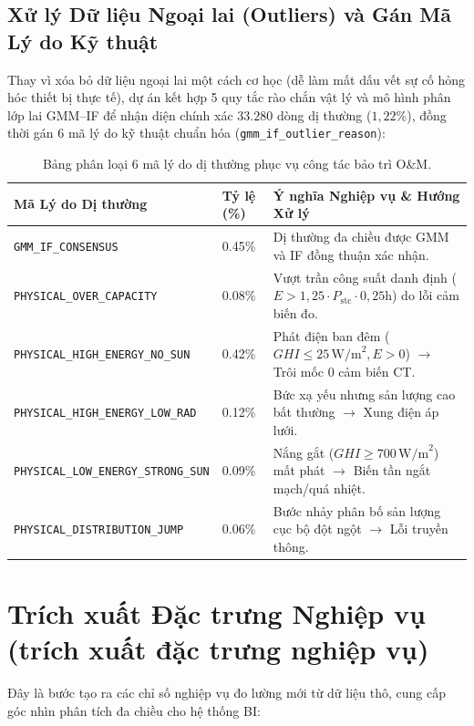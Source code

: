 \documentclass[12pt, a4paper]{report}
\begin{document}
\subsection{Xử lý Dữ liệu Ngoại lai (Outliers) và Gán Mã Lý do Kỹ thuật}
Thay vì xóa bỏ dữ liệu ngoại lai một cách cơ học (dễ làm mất dấu vết sự cố hỏng hóc thiết bị thực tế), dự án kết hợp 5 quy tắc rào chắn vật lý và mô hình phân lớp lai GMM--IF để nhận diện chính xác $33.280$ dòng dị thường ($1{,}22\%$), đồng thời gán 6 mã lý do kỹ thuật chuẩn hóa (\texttt{gmm\_if\_outlier\_reason}):

\begin{table}[H]
\centering
\small
\renewcommand{\arraystretch}{1.25}
\begin{tabularx}{\textwidth}{@{} l l X @{}}
\toprule
\textbf{Mã Lý do Dị thường} & \textbf{Tỷ lệ (\%)} & \textbf{Ý nghĩa Nghiệp vụ \& Hướng Xử lý} \\
\midrule
\texttt{GMM\_IF\_CONSENSUS} & 0.45\% & Dị thường đa chiều được GMM và IF đồng thuận xác nhận. \\
\texttt{PHYSICAL\_OVER\_CAPACITY} & 0.08\% & Vượt trần công suất danh định ($E > 1{,}25 \cdot P_{\text{stc}} \cdot 0{,}25\text{h}$) do lỗi cảm biến đo. \\
\texttt{PHYSICAL\_HIGH\_ENERGY\_NO\_SUN} & 0.42\% & Phát điện ban đêm ($GHI \le 25\,\text{W/m}^2, E > 0$) $\rightarrow$ Trôi mốc 0 cảm biến CT. \\
\texttt{PHYSICAL\_HIGH\_ENERGY\_LOW\_RAD} & 0.12\% & Bức xạ yếu nhưng sản lượng cao bất thường $\rightarrow$ Xung điện áp lưới. \\
\texttt{PHYSICAL\_LOW\_ENERGY\_STRONG\_SUN} & 0.09\% & Nắng gắt ($GHI \ge 700\,\text{W/m}^2$) mất phát $\rightarrow$ Biến tần ngắt mạch/quá nhiệt. \\
\texttt{PHYSICAL\_DISTRIBUTION\_JUMP} & 0.06\% & Bước nhảy phân bố sản lượng cục bộ đột ngột $\rightarrow$ Lỗi truyền thông. \\
\bottomrule
\end{tabularx}
\caption{Bảng phân loại 6 mã lý do dị thường phục vụ công tác bảo trì O\&M.}
\label{tab:outlier_reasons}
\end{table}

\section{Trích xuất Đặc trưng Nghiệp vụ (trích xuất đặc trưng nghiệp vụ)}
\label{sec:feature_engineering}

Đây là bước tạo ra các chỉ số nghiệp vụ đo lường mới từ dữ liệu thô, cung cấp góc nhìn phân tích đa chiều cho hệ thống BI:
\end{document}
